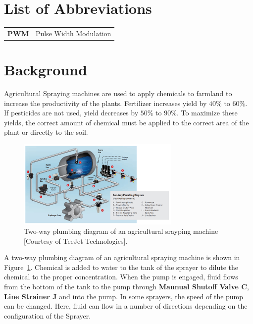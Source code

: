 \section*{List of Abbreviations}
\label{sec:abbreviations}

\begin{tabular}{ll}
  {\bf PWM}& Pulse Width Modulation\\
\end{tabular}
\section{Background}
\label{sec:background}

Agricultural Spraying machines are used to apply chemicals to farmland to increase the productivity of the plants.  Fertilizer increases yield by $40\%$ to $60\%.$  If pesticides are not used, yield decreases by $50\%$ to $90\%.$  To maximize these yields, the correct amount of chemical must be applied to the correct area of the plant or directly to the soil. 
%
\begin{figure}
  \centering
  \includegraphics[width=0.7\textwidth]{figs/img/twoWayPlumbingDiagramSrayingMachine}
  \caption{Two-way plumbing diagram of an agricultural srayping machine [Courtesy of TeeJet Technologies].}
  \label{fig:twoWayPlumbingDiagramSrayingMachine}
\end{figure}

A two-way plumbing diagram of an agricultural spraying machine is shown in Figure~\ref{fig:twoWayPlumbingDiagramSrayingMachine}.  Chemical is added to water to the tank of the sprayer to dilute the chemical to the proper concentration. When the pump is engaged, fluid flows from the bottom of the tank to the pump through \textbf{Maunual Shutoff Valve C}, \textbf{Line Strainer J} and into the pump. In some sprayers, the speed of the pump can be changed. Here, fluid can flow in a number of directions depending on the configuration of the Sprayer. 

